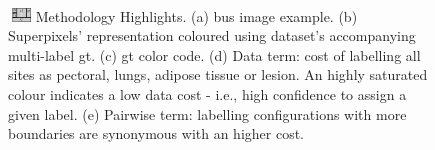\begin{figure}[t]
    \hfill
    \begin{subfigure}[b]{0.23\textwidth}
        \centering
        \label{fig:methodTerms:boundary}
    \end{subfigure}
    \\
    \centering
    \begin{subfigure}[b]{\textwidth}
        \centering
        
        \label{fig:methodTerms:boundary}
    \end{subfigure}

    \caption {
      \protect\includegraphics[height=1em]{fig_legend.pdf}
      \small Methodology Highlights.
      (a) \acs{bus} image example.
      (b) Superpixels' representation coloured using dataset's accompanying multi-label \acs{gt}.
      (c) \ac{gt} color code.
      (d) Data term: cost of labelling all sites as pectoral, lungs, adipose tissue or lesion.
      An highly saturated colour indicates a low data cost - i.e., high confidence to assign a given label.
      (e) Pairwise term: labelling configurations with more boundaries are synonymous with an higher cost.}
    \label{fig:methodTerms}
\end{figure}

